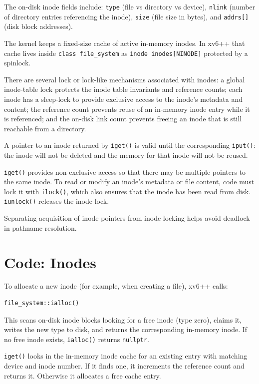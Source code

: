 The on-disk inode fields include:
\lstinline{type} (file vs directory vs device),
\lstinline{nlink} (number of directory entries referencing the inode),
\lstinline{size} (file size in bytes),
and \lstinline{addrs[]} (disk block addresses).

The kernel keeps a fixed-size cache of active in-memory inodes.
In xv6++ that cache lives inside \lstinline{class file_system} as
\lstinline{inode inodes[NINODE]} protected by a spinlock.

There are several lock or lock-like mechanisms associated with inodes:
a global inode-table lock protects the inode table invariants and reference counts;
each inode has a sleep-lock to provide exclusive access to the inode’s metadata and content;
the reference count prevents reuse of an in-memory inode entry while it is referenced;
and the on-disk link count prevents freeing an inode that is still reachable from a directory.

A pointer to an inode returned by \lstinline{iget()} is valid until the corresponding \lstinline{iput()}:
the inode will not be deleted and the memory for that inode will not be reused.

\lstinline{iget()} provides non-exclusive access so that there may be multiple pointers to the same inode.
To read or modify an inode’s metadata or file content, code must lock it with \lstinline{ilock()},
which also ensures that the inode has been read from disk. \lstinline{iunlock()} releases the inode lock.

Separating acquisition of inode pointers from inode locking helps avoid deadlock in pathname resolution.

\section{Code: Inodes}

To allocate a new inode (for example, when creating a file),
xv6++ calls:
\begin{lstlisting}
file_system::ialloc()
\end{lstlisting}
This scans on-disk inode blocks looking for a free inode (type zero), claims it,
writes the new type to disk, and returns the corresponding in-memory inode.
If no free inode exists, \lstinline{ialloc()} returns \lstinline{nullptr}.

\lstinline{iget()} looks in the in-memory inode cache for an existing entry with matching device and inode number.
If it finds one, it increments the reference count and returns it. Otherwise it allocates a free cache entry.

